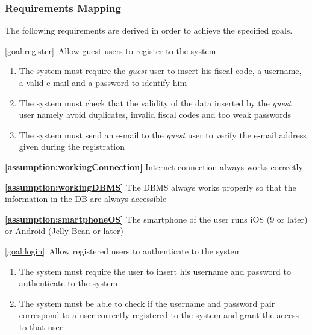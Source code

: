 \subsubsection{Requirements Mapping}

	The following requirements are derived in order to achieve the specified goals.
	\begin{description}
		\item \ref{goal:register}\ Allow guest users to register to the system
			\begin{enumerate}[label=\textbf{R\arabic*}]
			
  				\item The system must require the \emph{guest} user to insert his fiscal code, a username, a valid e-mail and a password to identify him
  				
   				\item The system must check that the validity of the data inserted by the \emph{guest} user namely avoid duplicates, invalid fiscal codes and too weak passwords
   				
   				\item The system must send an e-mail to the \emph{guest} user to verify the e-mail address given during the registration
   
  			\end{enumerate}
  				
			\textbf{\ref{assumption:workingConnection}} Internet connection always works correctly
			
			\textbf{\ref{assumption:workingDBMS}} The DBMS always works properly so that the information in the DB are always accessible
			
			\textbf{\ref{assumption:smartphoneOS}} The smartphone of the user runs iOS (9 or later) or Android (Jelly Bean or later)
			
  			
		\item \ref{goal:login}\ Allow registered users to authenticate to the system
			\begin{enumerate}[label=\textbf{R\arabic*}, resume]
  				\item The system must require the user to insert his username and password to authenticate to the system
   				\item The system must be able to check if the username and password pair correspond to a user correctly registered to the system and grant the access to that user

			\end{enumerate}
			

\end{description}
